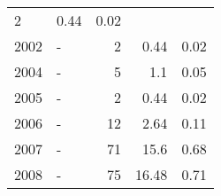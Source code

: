 \begin{longtable}{lXrrr}
       \num{2} &
       \num[round-mode=places,round-precision=2]{0,44} &
         \num[round-mode=places,round-precision=2]{0,02} \\

     2002 &
     \multicolumn{1}{X}{ -  } &


       \num{2} &
       \num[round-mode=places,round-precision=2]{0,44} &
         \num[round-mode=places,round-precision=2]{0,02} \\

     2004 &
     \multicolumn{1}{X}{ -  } &


       \num{5} &
       \num[round-mode=places,round-precision=2]{1,1} &
         \num[round-mode=places,round-precision=2]{0,05} \\

     2005 &
     \multicolumn{1}{X}{ -  } &


       \num{2} &
       \num[round-mode=places,round-precision=2]{0,44} &
         \num[round-mode=places,round-precision=2]{0,02} \\

     2006 &
     \multicolumn{1}{X}{ -  } &


       \num{12} &
       \num[round-mode=places,round-precision=2]{2,64} &
         \num[round-mode=places,round-precision=2]{0,11} \\

     2007 &
     \multicolumn{1}{X}{ -  } &


       \num{71} &
       \num[round-mode=places,round-precision=2]{15,6} &
         \num[round-mode=places,round-precision=2]{0,68} \\

     2008 &
     \multicolumn{1}{X}{ -  } &


       \num{75} &
       \num[round-mode=places,round-precision=2]{16,48} &
         \num[round-mode=places,round-precision=2]{0,71} \\


\end{longtable}
